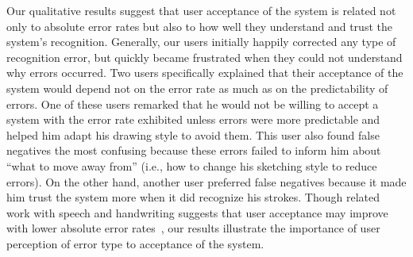 \documentclass{elsart}
\begin{document}
Our qualitative results suggest that user acceptance of the system is
related not only to absolute error rates but also to how well they
understand and trust the system's recognition.  Generally, our users
initially happily corrected any type of recognition error, but
quickly became frustrated when they could not understand why errors
occurred.  Two users specifically explained that their acceptance of
the system would depend not on the error rate as much as on the
predictability of errors.  One of these users remarked that he would
not be willing to accept a system with the error rate exhibited unless
errors were more predictable and helped him adapt his drawing style to
avoid them.  This user also found false negatives the most confusing
because these errors failed to inform him about ``what to move away
from'' (i.e., how to change his sketching style to reduce errors).  On
the other hand, another user preferred false negatives because it made
him trust the system more when it did recognize his strokes.  Though
related work with speech and handwriting suggests that user acceptance
may improve with lower absolute error
rates~\cite{Wu03ChineseCharacterRecog,Munteanu2006Effect}, our results
illustrate the importance of user perception of error type to
acceptance of the system.  

\end{document}
